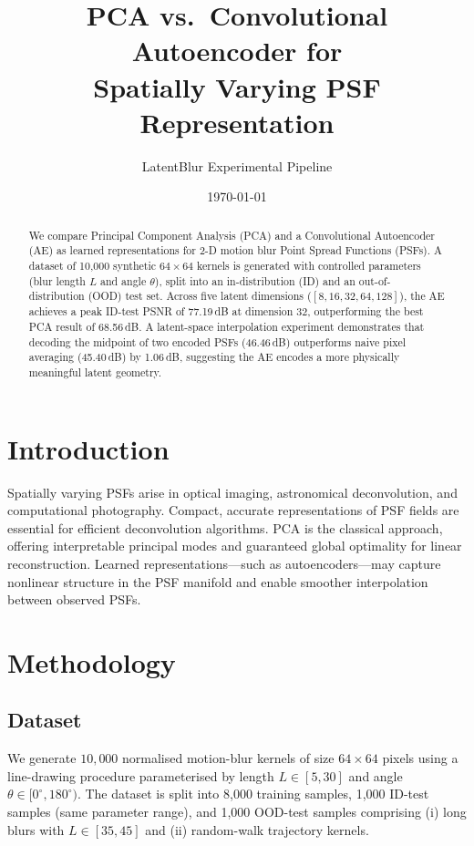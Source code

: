 \documentclass{article}
\title{PCA vs.\ Convolutional Autoencoder for\\
        Spatially Varying PSF Representation}
\author{LatentBlur Experimental Pipeline}
\date{\today}
\begin{document}
\maketitle

\begin{abstract}
We compare Principal Component Analysis (PCA) and a Convolutional
Autoencoder (AE) as learned representations for 2-D motion blur
Point Spread Functions (PSFs). A dataset of 10{,}000 synthetic
$64\times64$ kernels is generated with controlled parameters
(blur length $L$ and angle $\theta$), split into an in-distribution
(ID) and an out-of-distribution (OOD) test set. Across five latent
dimensions ($[8,16,32,64,128]$), the AE achieves a peak ID-test PSNR
of 77.19\,dB at dimension 32, outperforming
the best PCA result of 68.56\,dB. A latent-space
interpolation experiment demonstrates that decoding the midpoint of
two encoded PSFs (46.46\,dB) outperforms naive pixel
averaging (45.40\,dB) by 1.06\,dB, suggesting the
AE encodes a more physically meaningful latent geometry.
\end{abstract}

\section{Introduction}
Spatially varying PSFs arise in optical imaging, astronomical
deconvolution, and computational photography. Compact, accurate
representations of PSF fields are essential for efficient
deconvolution algorithms. PCA is the classical approach, offering
interpretable principal modes and guaranteed global optimality for
linear reconstruction. Learned representations---such as
autoencoders---may capture nonlinear structure in the PSF manifold
and enable smoother interpolation between observed PSFs.

\section{Methodology}

\subsection{Dataset}
We generate $10{,}000$ normalised motion-blur kernels of size
$64\times64$ pixels using a line-drawing procedure parameterised by
length $L\in[5,30]$ and angle $\theta\in[0^{\circ},180^{\circ})$.
The dataset is split into 8{,}000 training samples, 1{,}000 ID-test
samples (same parameter range), and 1{,}000 OOD-test samples
comprising (i) long blurs with $L\in[35,45]$ and (ii) random-walk
trajectory kernels.
\end{document}
